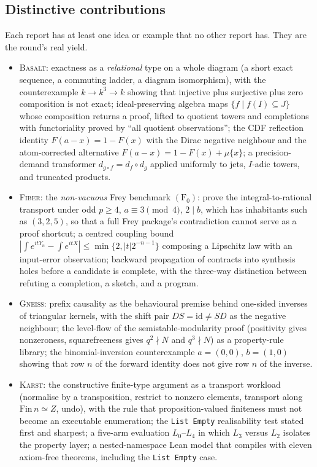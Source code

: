\documentclass[11pt,a4paper]{article}
\newcommand{\code}[1]{\nolinkurl{#1}}
\newcommand{\Bs}{\textsc{Basalt}}
\newcommand{\Fb}{\textsc{Fiber}}
\newcommand{\Gn}{\textsc{Gneiss}}
\newcommand{\Ks}{\textsc{Karst}}
\theoremstyle{definition}
\begin{document}
\subsection{Distinctive contributions}
Each report has at least one idea or example that no other report has. They are the round's real yield.
\begin{itemize}
\item \Bs: exactness as a \emph{relational} type on a whole diagram (a short exact sequence, a commuting ladder, a diagram isomorphism), with the counterexample $k\to k^3\to k$ showing that injective plus surjective plus zero composition is not exact; ideal-preserving algebra maps $\{f\mid f(I)\subseteq J\}$ whose composition returns a proof, lifted to quotient towers and completions with functoriality proved by ``all quotient observations''; the CDF reflection identity $F(a-x)=1-F(x)$ with the Dirac negative neighbour and the atom-corrected alternative $F(a-x)=1-F(x)+\mu\{x\}$; a precision-demand transformer $d_{g\circ f}=d_f\circ d_g$ applied uniformly to jets, $I$-adic towers, and truncated products.
\item \Fb: the \emph{non-vacuous} Frey benchmark $(\mathrm{F}_0)$: prove the integral-to-rational transport under odd $p\ge4$, $a\equiv3\pmod 4$, $2\mid b$, which has inhabitants such as $(3,2,5)$, so that a full Frey package's contradiction cannot serve as a proof shortcut; a centred coupling bound $|\int e^{itY_n}-\int e^{itX}|\le\min\{2,|t|2^{-n-1}\}$ composing a Lipschitz law with an input-error observation; backward propagation of contracts into synthesis holes before a candidate is complete, with the three-way distinction between refuting a completion, a sketch, and a program.
\item \Gn: prefix causality as the behavioural premise behind one-sided inverses of triangular kernels, with the shift pair $DS=\mathrm{id}\ne SD$ as the negative neighbour; the level-flow of the semistable-modularity proof (positivity gives nonzeroness, squarefreeness gives $q^2\nmid N$ and $q^3\nmid N$) as a property-rule library; the binomial-inversion counterexample $a=(0,0)$, $b=(1,0)$ showing that row $n$ of the forward identity does not give row $n$ of the inverse.
\item \Ks: the constructive finite-type argument as a transport workload (normalise by a transposition, restrict to nonzero elements, transport along $\mathrm{Fin}\,n\simeq Z$, undo), with the rule that proposition-valued finiteness must not become an executable enumeration; the \code{List Empty} realisability test stated first and sharpest; a five-arm evaluation $L_0$--$L_4$ in which $L_3$ versus $L_2$ isolates the property layer; a nested-namespace Lean model that compiles with eleven axiom-free theorems, including the \code{List Empty} case.

\end{itemize}
\end{document}
